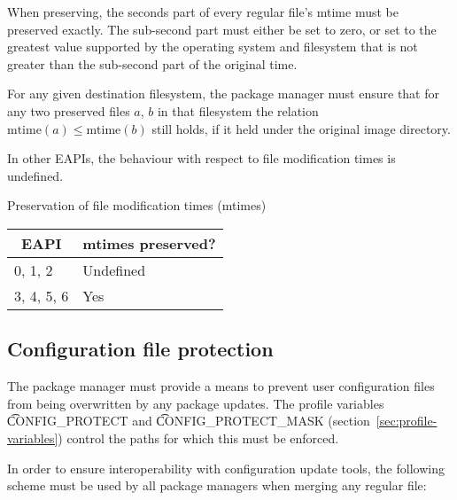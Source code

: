 When preserving, the seconds part of every regular file's mtime must
be preserved exactly. The sub-second part must either be set to zero,
or set to the greatest value supported by the operating system and
filesystem that is not greater than the sub-second part of the
original time.

For any given destination filesystem, the package manager must ensure
that for any two preserved files $a$, $b$ in that filesystem the
relation $\mbox{mtime}(a) \leq \mbox{mtime}(b)$ still holds, if it
held under the original image directory.

In other EAPIs, the behaviour with respect to file modification times
is undefined.

\begin{centertable}{Preservation of file modification times (mtimes)}
    \label{tab:mtime-preserve}
    \begin{tabular}{ll}
      \toprule
      \multicolumn{1}{c}{\textbf{EAPI}} &
      \multicolumn{1}{c}{\textbf{mtimes preserved?}} \\
      \midrule
      0, 1, 2           & Undefined \\
      3, 4, 5, 6        & Yes       \\
      \bottomrule
    \end{tabular}
\end{centertable}

\subsection{Configuration file protection}
\label{sec:config-protect}

The package manager must provide a means to prevent user configuration files from being
overwritten by any package updates. The profile variables \t{CONFIG_PROTECT} and
\t{CONFIG_PROTECT_MASK} (section~\ref{sec:profile-variables}) control the paths for which this
must be enforced.

In order to ensure interoperability with configuration update tools, the following scheme must be
used by all package managers when merging any regular file:

